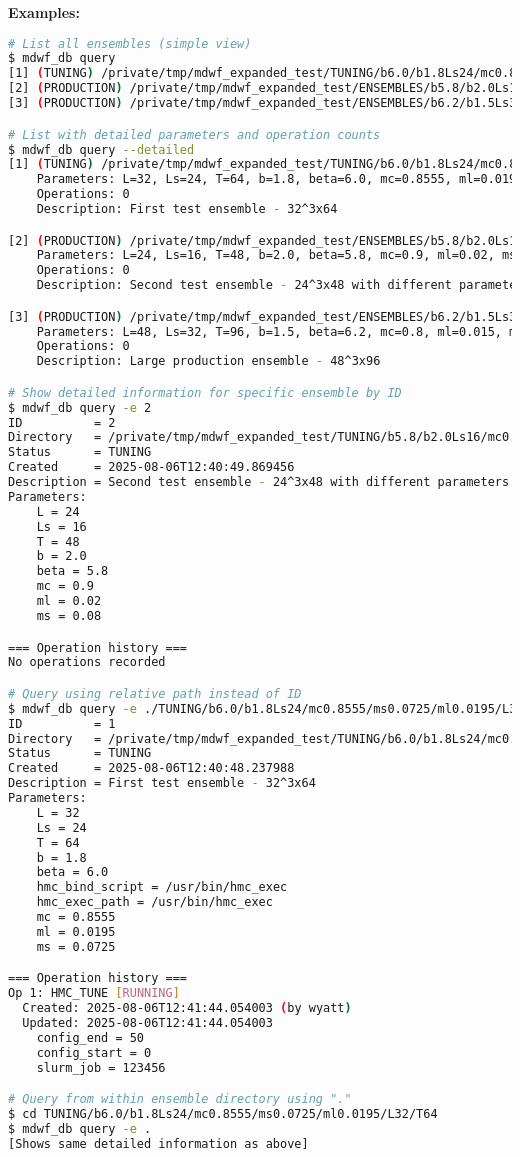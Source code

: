 \documentclass{article}
\begin{document}
\textbf{Examples:}
\begin{lstlisting}[language=bash]
# List all ensembles (simple view)
$ mdwf_db query
[1] (TUNING) /private/tmp/mdwf_expanded_test/TUNING/b6.0/b1.8Ls24/mc0.8555/ms0.0725/ml0.0195/L32/T64
[2] (PRODUCTION) /private/tmp/mdwf_expanded_test/ENSEMBLES/b5.8/b2.0Ls16/mc0.9/ms0.08/ml0.02/L24/T48
[3] (PRODUCTION) /private/tmp/mdwf_expanded_test/ENSEMBLES/b6.2/b1.5Ls32/mc0.8/ms0.06/ml0.015/L48/T96

# List with detailed parameters and operation counts
$ mdwf_db query --detailed  
[1] (TUNING) /private/tmp/mdwf_expanded_test/TUNING/b6.0/b1.8Ls24/mc0.8555/ms0.0725/ml0.0195/L32/T64
    Parameters: L=32, Ls=24, T=64, b=1.8, beta=6.0, mc=0.8555, ml=0.0195, ms=0.0725
    Operations: 0
    Description: First test ensemble - 32^3x64

[2] (PRODUCTION) /private/tmp/mdwf_expanded_test/ENSEMBLES/b5.8/b2.0Ls16/mc0.9/ms0.08/ml0.02/L24/T48
    Parameters: L=24, Ls=16, T=48, b=2.0, beta=5.8, mc=0.9, ml=0.02, ms=0.08
    Operations: 0
    Description: Second test ensemble - 24^3x48 with different parameters

[3] (PRODUCTION) /private/tmp/mdwf_expanded_test/ENSEMBLES/b6.2/b1.5Ls32/mc0.8/ms0.06/ml0.015/L48/T96
    Parameters: L=48, Ls=32, T=96, b=1.5, beta=6.2, mc=0.8, ml=0.015, ms=0.06
    Operations: 0
    Description: Large production ensemble - 48^3x96

# Show detailed information for specific ensemble by ID
$ mdwf_db query -e 2
ID          = 2
Directory   = /private/tmp/mdwf_expanded_test/TUNING/b5.8/b2.0Ls16/mc0.9/ms0.08/ml0.02/L24/T48
Status      = TUNING
Created     = 2025-08-06T12:40:49.869456
Description = Second test ensemble - 24^3x48 with different parameters
Parameters:
    L = 24
    Ls = 16
    T = 48
    b = 2.0
    beta = 5.8
    mc = 0.9
    ml = 0.02
    ms = 0.08

=== Operation history ===
No operations recorded

# Query using relative path instead of ID
$ mdwf_db query -e ./TUNING/b6.0/b1.8Ls24/mc0.8555/ms0.0725/ml0.0195/L32/T64
ID          = 1
Directory   = /private/tmp/mdwf_expanded_test/TUNING/b6.0/b1.8Ls24/mc0.8555/ms0.0725/ml0.0195/L32/T64
Status      = TUNING
Created     = 2025-08-06T12:40:48.237988
Description = First test ensemble - 32^3x64
Parameters:
    L = 32
    Ls = 24
    T = 64
    b = 1.8
    beta = 6.0
    hmc_bind_script = /usr/bin/hmc_exec
    hmc_exec_path = /usr/bin/hmc_exec
    mc = 0.8555
    ml = 0.0195
    ms = 0.0725

=== Operation history ===
Op 1: HMC_TUNE [RUNNING]
  Created: 2025-08-06T12:41:44.054003 (by wyatt)
  Updated: 2025-08-06T12:41:44.054003
    config_end = 50
    config_start = 0
    slurm_job = 123456

# Query from within ensemble directory using "."
$ cd TUNING/b6.0/b1.8Ls24/mc0.8555/ms0.0725/ml0.0195/L32/T64
$ mdwf_db query -e .
[Shows same detailed information as above]
\end{lstlisting}
\end{document}
